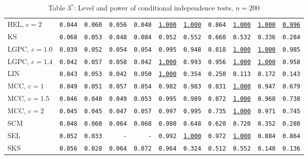\begin{table}[h]
{\begin{tabular}{l|rrrr|rrrrrr}
HEL, $\scriptstyle c = 2$&\texttt{0.044}&\texttt{0.060}&\texttt{0.056}&\texttt{0.048}&\texttt{\underline{1.000}}&\texttt{\underline{1.000}}&\texttt{0.864}&\texttt{\underline{1.000}}&\texttt{\underline{1.000}}&\texttt{\underline{0.996}}\\
KS&\texttt{0.068}&\texttt{0.053}&\texttt{0.048}&\texttt{0.084}&\texttt{0.952}&\texttt{0.552}&\texttt{0.660}&\texttt{0.532}&\texttt{0.336}&\texttt{0.284}\\
\rowcolor{Gray}LGPC, $\scriptstyle c = 1.0$&\texttt{0.039}&\texttt{0.052}&\texttt{0.054}&\texttt{0.054}&\texttt{0.995}&\texttt{0.948}&\texttt{0.818}&\texttt{\underline{1.000}}&\texttt{\underline{1.000}}&\texttt{0.985}\\
\rowcolor{Gray}LGPC, $\scriptstyle c = 1.4$&\texttt{0.042}&\texttt{0.057}&\texttt{0.058}&\texttt{0.042}&\texttt{\underline{1.000}}&\texttt{0.993}&\texttt{0.956}&\texttt{\underline{1.000}}&\texttt{\underline{1.000}}&\texttt{0.958}\\
LIN&\texttt{0.043}&\texttt{0.053}&\texttt{0.042}&\texttt{0.050}&\texttt{\underline{1.000}}&\texttt{0.354}&\texttt{0.250}&\texttt{0.113}&\texttt{0.172}&\texttt{0.143}\\
MCC, $\scriptstyle c = 1$&\texttt{0.049}&\texttt{0.051}&\texttt{0.057}&\texttt{0.054}&\texttt{0.982}&\texttt{0.983}&\texttt{0.831}&\texttt{\underline{1.000}}&\texttt{0.947}&\texttt{0.679}\\
MCC, $\scriptstyle c = 1.5$&\texttt{0.046}&\texttt{0.048}&\texttt{0.049}&\texttt{0.053}&\texttt{0.995}&\texttt{0.989}&\texttt{0.872}&\texttt{\underline{1.000}}&\texttt{0.968}&\texttt{0.738}\\
MCC, $\scriptstyle c = 2$&\texttt{0.045}&\texttt{0.045}&\texttt{0.047}&\texttt{0.057}&\texttt{0.997}&\texttt{0.995}&\texttt{0.735}&\texttt{\underline{1.000}}&\texttt{0.971}&\texttt{0.745}\\
SCM&\texttt{0.048}&\texttt{0.060}&\texttt{0.064}&\texttt{0.068}&\texttt{0.980}&\texttt{0.648}&\texttt{0.620}&\texttt{0.720}&\texttt{0.352}&\texttt{0.280}\\
SEL&\texttt{0.052}&\texttt{0.033}&\texttt{-}&\texttt{-}&\texttt{0.992}&\texttt{\underline{1.000}}&\texttt{0.972}&\texttt{\underline{1.000}}&\texttt{0.884}&\texttt{0.864}\\
SKS&\texttt{0.056}&\texttt{0.028}&\texttt{0.064}&\texttt{0.072}&\texttt{0.964}&\texttt{0.324}&\texttt{0.512}&\texttt{0.552}&\texttt{0.148}&\texttt{0.136}\\
\bottomrule
\end{tabular}}
\caption*{Table 3$^*$: Level and power of conditional independence tests, $n = 200$}
\label{tab:n200}
\end{table}




